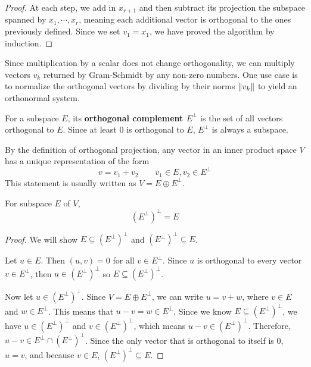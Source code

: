 \begin{proof}
At each step, we add in $x_{r + 1}$ and then subtract its projection the subspace spanned by $x_{1}, \cdots, x_{r}$, meaning each additional vector is orthogonal to the ones previously defined. Since we set $v_{1} = x_{1}$, we have proved the algorithm by induction. 
\end{proof}

Since multiplication by a scalar does not change orthogonality, we can multiply vectors $v_{k}$ returned by Gram-Schmidt by any non-zero numbers. One use case is to normalize the orthogonal vectors by dividing by their norms $\lVert v_{k}\rVert$ to yield an orthonormal system. 

\begin{definition}
For a subspace $E$, its \textbf{orthogonal complement $E^{\perp}$} is the set of all vectors orthogonal to $E$. Since at least 0 is orthogonal to $E$, $E^{\perp}$ is always a subspace. 
\end{definition}

By the definition of orthogonal projection, any vector in an inner product space $V$ has a unique representation of the form 
$$v = v_{1} + v_{2} \qquad v_{1} \in E, v_{2} \in E^{\perp}$$
This statement is usually written as $V = E \oplus E^{\perp}$.

\begin{theorem}
For subspace $E$ of $V$, 
$$(E^{\perp})^{\perp} = E$$
\end{theorem}

\begin{proof}
We will show $E \subseteq (E^{\perp})^{\perp}$ and $(E^{\perp})^{\perp} \subseteq E$.

Let $u \in E$. Then $(u, v) = 0$ for all $v \in E^{\perp}$. Since $u$ is orthogonal to every vector $v \in E^{\perp}$, then $u \in (E^{\perp})^{\perp}$ so $E \subseteq (E^{\perp})^{\perp}$. 

Now let $u \in (E^{\perp})^{\perp}$. Since $V = E \oplus E^{\perp}$, we can write $u = v + w$, where $v \in E$ and $w \in E^{\perp}$. This means that $u - v = w \in E^{\perp}$. Since we know $E \subseteq (E^{\perp})^{\perp}$, we have $u \in  (E^{\perp})^{\perp}$ and $v \in (E^{\perp})^{\perp}$, which means $u - v \in  (E^{\perp})^{\perp}$. Therefore, $u - v \in E^{\perp} \cap (E^{\perp})^{\perp}$. Since the only vector that is orthogonal to itself is 0, $u = v$, and because $v \in E$, $(E^{\perp})^{\perp} \subseteq E$. 
\end{proof}

